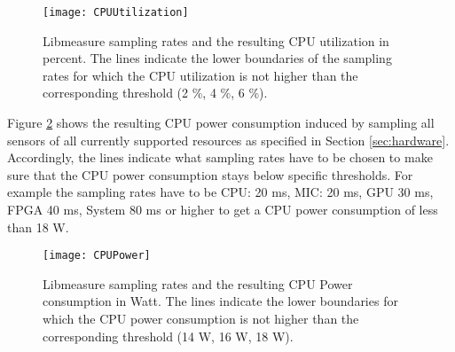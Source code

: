 \begin{figure}[!h]
\begin{center}
\texttt{[image: CPUUtilization]} 
\caption{Libmeasure sampling rates and the resulting CPU utilization in percent. The lines indicate the lower boundaries of the sampling rates for which the CPU utilization is not higher than the corresponding threshold (2 \%, 4 \%, 6 \%).}
\label{fig:CPUUtilization}
\end{center}
\end{figure}

Figure \ref{fig:CPUPower} shows the resulting CPU power consumption induced by sampling all sensors of all currently supported resources as specified in Section \ref{sec:hardware}. Accordingly, the lines indicate what sampling rates have to be chosen to make sure that the CPU power consumption stays below specific thresholds. For example the sampling rates have to be CPU: 20 ms, MIC: 20 ms, GPU 30 ms, FPGA 40 ms, System 80 ms or higher to get a CPU power consumption of less than 18 W.\\

\begin{figure}[!h]
\begin{center}
\texttt{[image: CPUPower]} 
\caption{Libmeasure sampling rates and the resulting CPU Power consumption in Watt. The lines indicate the lower boundaries for which the CPU power consumption is not higher than the corresponding threshold (14 W, 16 W, 18 W).}
\label{fig:CPUPower}
\end{center}
\end{figure}

\clearpage

